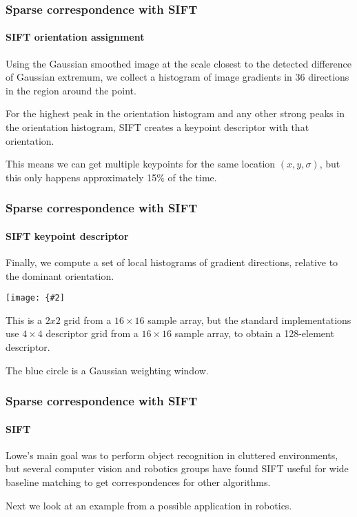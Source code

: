 \documentclass[aspectratio=169]{beamer}
\newcommand{\myfig}[3]{\centerline{\texttt{[image: \{\#2]}}}
    \centerline{\scriptsize #3}}
\begin{document}
\begin{frame}
\frametitle{Sparse correspondence with SIFT}
\framesubtitle{SIFT orientation assignment}

Using the Gaussian smoothed image at the scale closest to the detected
difference of Gaussian extremum, we collect a \alert{histogram} of
image gradients in 36 directions in the region around the point.

\medskip

For the \alert{highest peak in the orientation histogram} and any
other strong peaks in the orientation histogram, SIFT creates a
keypoint descriptor with that orientation.

\medskip

This means we can get multiple keypoints for the same location
$(x,y,\sigma)$, but this only happens approximately 15\% of the time.

\end{frame}

\begin{frame}
\frametitle{Sparse correspondence with SIFT}
\framesubtitle{SIFT keypoint descriptor}

Finally, we compute a set of local histograms of gradient directions,
\alert{relative to the dominant orientation}.

\myfig{2.5in}{SIFT-fig7}{Lowe (2004), Fig.\ 7}

This is a $2x2$ grid from a $16\times 16$ sample array, but the
standard implementations use $4\times 4$ descriptor grid from a
$16\times 16$ sample array, to obtain a 128-element descriptor.

\medskip

The blue circle is a Gaussian weighting window.

\end{frame}


\begin{frame}
\frametitle{Sparse correspondence with SIFT}
\framesubtitle{SIFT}

Lowe's main goal was to perform \alert{object recognition} in
cluttered environments, but several computer vision and robotics
groups have found SIFT useful for \alert{wide baseline matching} to
get correspondences for other algorithms.

\medskip

Next we look at an example from a possible application in robotics.

\end{frame}
\end{document}
